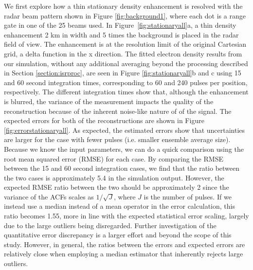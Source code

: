 We first explore how a thin stationary density enhancement is resolved with the radar beam pattern shown in Figure \ref{fig:background1}, where each dot is a range gate in one of the 25 beams used. In Figure~\ref{fig:stationaryall}a, a thin density enhancement 2 km in width and 5 times the background is placed in the radar field of view. The enhancement is at the resolution limit of the original Cartesian grid, a delta function in the x direction.  The fitted electron density results from our simulation, without any additional averaging beyond the processing described in Section \ref{section:isrproc},
are seen in Figure \ref{fig:stationaryall}b and c using 15 and 60 second integration times, corresponding to 60 and 240 pulses per position, respectively. The different integration times show that, although the enhancement is blurred, the variance of the measurement impacts the quality of the reconstruction because of the inherent noise-like nature of of the signal. The expected errors for both of the reconstructions are shown in Figure \ref{fig:errorstationaryall}. As expected, the estimated errors show that uncertainties are larger for the case with fewer pulses (i.e. smaller ensemble average size). 
Because we know the input parameters, we can do a quick comparison using the root mean squared error (RMSE) for each case. By comparing the RMSE between the 15 and 60 second integration cases, we find that the ratio between the two cases is approximately 5.4 in the simulation output.  However, the expected RMSE ratio between the two should be approximately 2 since the variance of the ACFs scales as $1/\sqrt{J}$, where $J$ is the number of pulses. If we instead use a median instead of a mean operator in the error calculation, this ratio becomes 1.55, more in line with the expected statistical error scaling, largely due to the large outliers being disregarded.  Further investigation of the quantitative error discrepancy is a larger effort and beyond the scope of this study.  However, in general, the ratios between the errors and expected errors are relatively close when employing a median estimator that inherently rejects large outliers.
